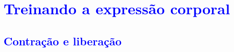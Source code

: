 




\chapter{\textcolor{blue}{ Treinando a expressão corporal}}



\section{\textcolor{blue}{ Contração e liberação}}

